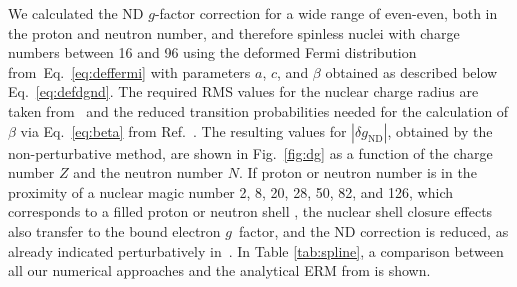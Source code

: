 We calculated the ND $g$-factor correction for a wide range of even-even, both in the proton and neutron number, and therefore spinless nuclei with charge numbers between 16 and 96 using the deformed Fermi distribution from~Eq.~\eqref{eq:deffermi} with parameters $a$, $c$, and $\beta$ obtained as described below Eq.~\eqref{eq:defdgnd}. The required RMS values for the nuclear charge radius are taken from~\cite{Angeli2013} and the reduced transition probabilities needed for the calculation of $\beta$ via Eq.~\eqref{eq:beta} from Ref.~\cite{ENSDF}. The resulting values for $|\delta g_{\text{ND}}|$, obtained by the non-perturbative method, are shown in Fig.~\ref{fig:dg} as a function of the charge number $Z$ and the neutron number $N$. If proton or neutron number is in the proximity of a nuclear magic number 2, 8, 20, 28, 50, 82, and 126, which corresponds to a filled proton or neutron shell \cite{Ring}, the nuclear shell closure effects also transfer to the bound electron $g$~factor, and the ND correction is reduced, as already indicated perturbatively in~\cite{michel2015}. In Table \ref{tab:spline}, a comparison between all our numerical approaches and the analytical ERM from \cite{jacek2012} is shown.

